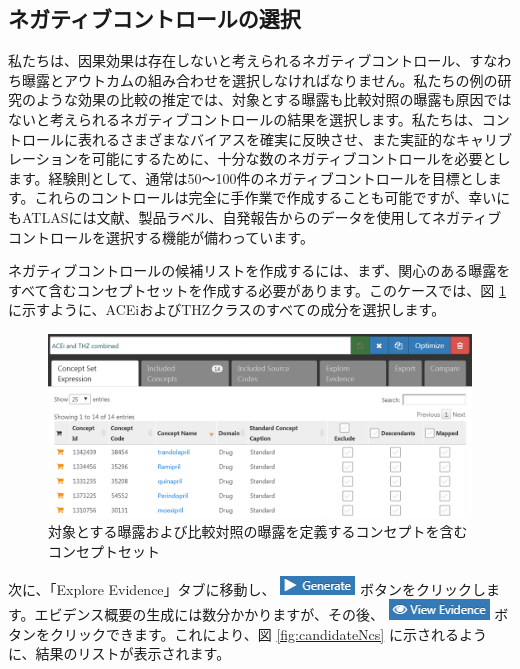 \documentclass[
  11pt]{book}
\theoremstyle{definition}
\theoremstyle{definition}
\theoremstyle{definition}
\theoremstyle{definition}
\theoremstyle{remark}
\begin{document}
\subsection{ネガティブコントロールの選択}\label{ux30cdux30acux30c6ux30a3ux30d6ux30b3ux30f3ux30c8ux30edux30fcux30ebux306eux9078ux629e}

私たちは、因果効果は存在しないと考えられるネガティブコントロール、すなわち曝露とアウトカムの組み合わせを選択しなければなりません。私たちの例の研究のような効果の比較の推定では、対象とする曝露も比較対照の曝露も原因ではないと考えられるネガティブコントロールの結果を選択します。私たちは、コントロールに表れるさまざまなバイアスを確実に反映させ、また実証的なキャリブレーションを可能にするために、十分な数のネガティブコントロールを必要とします。経験則として、通常は50～100件のネガティブコントロールを目標とします。これらのコントロールは完全に手作業で作成することも可能ですが、幸いにもATLASには文献、製品ラベル、自発報告からのデータを使用してネガティブコントロールを選択する機能が備わっています。

ネガティブコントロールの候補リストを作成するには、まず、関心のある曝露をすべて含むコンセプトセットを作成する必要があります。このケースでは、図 \ref{fig:exposuresConceptSet} に示すように、ACEiおよびTHZクラスのすべての成分を選択します。

\begin{figure}

{\centering \includegraphics[width=1\linewidth]{images/MethodValidity/exposuresConceptSet} 

}

\caption{対象とする曝露および比較対照の曝露を定義するコンセプトを含むコンセプトセット}\label{fig:exposuresConceptSet}
\end{figure}

次に、「Explore Evidence」タブに移動し、 \includegraphics{images/MethodValidity/generate.png} ボタンをクリックします。エビデンス概要の生成には数分かかりますが、その後、 \includegraphics{images/MethodValidity/viewEvidence.png} ボタンをクリックできます。これにより、図 \ref{fig:candidateNcs} に示されるように、結果のリストが表示されます。
\end{document}
